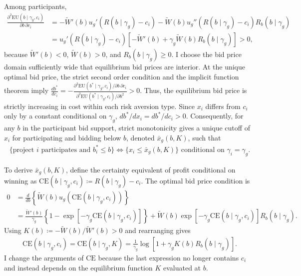 \documentclass[12pt]{article}
\theoremstyle{definition} %
\begin{document}
Among participants,
\begin{align*}
\frac{\partial^2\mathrm{EU}(b\mid\gamma_g,c_i)}{\partial b\,\partial c_i}
&=-\widetilde W'(b)u_g'(R(b\mid\gamma_g)-c_i)
-\widetilde W(b)u_g''(R(b\mid\gamma_g)-c_i)R_b(b\mid\gamma_g)\\
&=u_g'(R(b\mid\gamma_g)-c_i)
\left[-\widetilde W'(b)
+\gamma_g\widetilde W(b)R_b(b\mid\gamma_g)\right]>0,
\end{align*}
because $\widetilde W'(b)<0$, $\widetilde W(b)>0$, and $R_b(b\mid\gamma_g)\geq0$. I choose the bid price domain sufficiently wide that equilibrium bid prices are interior. At the unique optimal bid price, the strict second order condition and the implicit function theorem imply $\frac{db^\ast}{dc_i}=-\frac{\partial^2\mathrm{EU}(b^\ast\mid\gamma_g,c_i)/\partial b\,\partial c_i}{\partial^2\mathrm{EU}(b^\ast\mid\gamma_g,c_i)/\partial b^2}>0$. Thus, the equilibrium bid price is strictly increasing in cost within each risk aversion type. Since $x_i$ differs from $c_i$ only by a constant conditional on $\gamma_g$, $db^\ast/dx_i=db^\ast/dc_i>0$. Consequently, for any $b$ in the participant bid support, strict monotonicity gives a unique cutoff of $x_i$ for participating and bidding below $b$, denoted $\bar{x}_g(b,K)$, such that
\begin{align*}
\{\text{project $i$ participates and }b_i^\ast\leq b\}
\Longleftrightarrow
\{x_i\leq\bar{x}_g(b,K)\}
\text{ conditional on }\gamma_i=\gamma_g.
\end{align*}

To derive $\bar{x}_g(b,K)$, define the certainty equivalent of profit conditional on winning as $\mathrm{CE}(b\mid\gamma_g,c_i)\coloneqq R(b\mid\gamma_g)-c_i$. The optimal bid price condition is
\begin{align*}
0
&=\frac{d}{db}\left\{\widetilde W(b)u_g(\mathrm{CE}(b\mid\gamma_g,c_i))\right\}\\
&=\frac{\widetilde W'(b)}{\gamma_g}
\left\{1-\exp[-\gamma_g\mathrm{CE}(b\mid\gamma_g,c_i)]\right\}
+\widetilde W(b)\exp[-\gamma_g\mathrm{CE}(b\mid\gamma_g,c_i)]R_b(b\mid\gamma_g).
\end{align*}
Using $K(b)\coloneqq-\widetilde W(b)/\widetilde W'(b)>0$ and rearranging gives
\begin{align*}
\mathrm{CE}(b\mid\gamma_g,c_i)
=\mathrm{CE}(b\mid\gamma_g,K)
=\frac{1}{\gamma_g}\log\left[1+\gamma_gK(b)R_b(b\mid\gamma_g)\right].
\end{align*}
I change the arguments of $\mathrm{CE}$ because the last expression no longer contains $c_i$ and instead depends on the equilibrium function $K$ evaluated at $b$.
\end{document}
